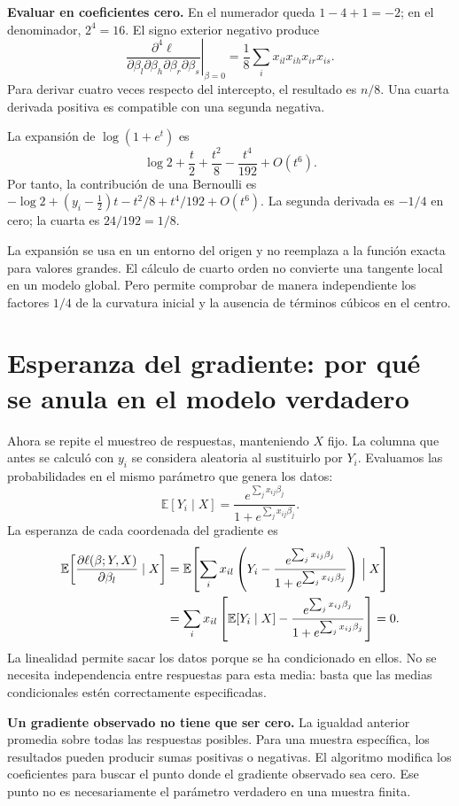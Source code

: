 \documentclass[11pt,a4paper]{article}
\newcommand{\E}{\mathbb E}
\begin{document}
\textbf{Evaluar en coeficientes cero.}
En el numerador queda $1-4+1=-2$; en el denominador, $2^4=16$.
El signo exterior negativo produce
\[
\left.\frac{\partial^4\ell}
{\partial\beta_l\partial\beta_h\partial\beta_r\partial\beta_s}
\right|_{\beta=0}
=\frac18\sum_i x_{il}x_{ih}x_{ir}x_{is}.
\]
Para derivar cuatro veces respecto del intercepto,
el resultado es $n/8$. Una cuarta derivada positiva es compatible
con una segunda negativa.

\begin{ejemplo}
La expansión de $\log(1+e^t)$ es
\[
\log2+\frac t2+\frac{t^2}{8}-\frac{t^4}{192}+O(t^6).
\]
Por tanto, la contribución de una Bernoulli es
$-\log2+(y_i-\tfrac12)t-t^2/8+t^4/192+O(t^6)$.
La segunda derivada es $-1/4$ en cero; la cuarta es $24/192=1/8$.
\end{ejemplo}
La expansión se usa en un entorno del origen y no reemplaza a la
función exacta para valores grandes.
El cálculo de cuarto orden no convierte una tangente local
en un modelo global.
Pero permite comprobar de manera independiente los factores
$1/4$ de la curvatura inicial y la ausencia de términos cúbicos en el centro.

\clearpage
\section{Esperanza del gradiente: por qué se anula en el modelo verdadero}\label{logit32}
Ahora se repite el muestreo de respuestas, manteniendo $X$ fijo.
La columna que antes se calculó con $y_i$ se considera aleatoria
al sustituirlo por $Y_i$.
Evaluamos las probabilidades en el mismo parámetro que genera los datos:
\[
\E[Y_i\mid X]=
\frac{e^{\sum_jx_{ij}\beta_j}}{1+e^{\sum_jx_{ij}\beta_j}}.
\]
La esperanza de cada coordenada del gradiente es
\[
\begin{aligned}
\E\!\left[\frac{\partial\ell(\beta;Y,X)}{\partial\beta_l}\mid X\right]
&=\E\!\left[
\sum_i x_{il}\left(Y_i-
\frac{e^{\sum_jx_{ij}\beta_j}}{1+e^{\sum_jx_{ij}\beta_j}}\right)
\Bigm| X\right]\\
&=\sum_i x_{il}\left[
\E[Y_i\mid X]-
\frac{e^{\sum_jx_{ij}\beta_j}}{1+e^{\sum_jx_{ij}\beta_j}}\right]=0.
\end{aligned}
\]
La linealidad permite sacar los datos porque se ha condicionado en ellos.
No se necesita independencia entre respuestas para esta media:
basta que las medias condicionales estén correctamente especificadas.

\textbf{Un gradiente observado no tiene que ser cero.}
La igualdad anterior promedia sobre todas las respuestas posibles.
Para una muestra específica, los resultados pueden producir
sumas positivas o negativas.
El algoritmo modifica los coeficientes para buscar el punto donde
el gradiente observado sea cero. Ese punto no es necesariamente
el parámetro verdadero en una muestra finita.
\end{document}
